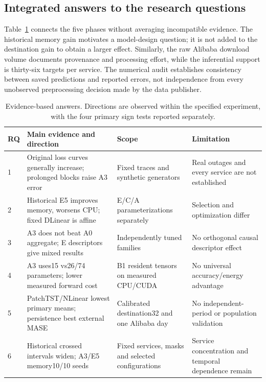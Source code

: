 \subsection{Integrated answers to the research questions}
Table~\ref{tab:rq} connects the five phases without averaging incompatible evidence. The historical memory gain motivates a model-design question; it is not added to the destination gain to obtain a larger effect. Similarly, the raw Alibaba download volume documents provenance and processing effort, while the inferential support is thirty-six targets per service. The numerical audit establishes consistency between saved predictions and reported errors, not independence from every unobserved preprocessing decision made by the data publisher.
\begin{table}[!t]
\caption{Evidence-based answers. Directions are observed within the specified experiment, with the four primary sign tests reported separately.}\label{tab:rq}
\centering\footnotesize
\begin{tabularx}{\linewidth}{p{.08\linewidth}XXX}
\toprule RQ & Main evidence and direction & Scope & Limitation \\\midrule
1 & Original loss curves generally increase; prolonged blocks raise A3 error & Fixed traces and synthetic generators & Real outages and every service are not established \\
2 & Historical E5 improves memory, worsens CPU; fixed DLinear is affine & E/C/A parameterizations separately & Selection and optimization differ \\
3 & A3 does not beat A0 aggregate; E descriptors give mixed results & Independently tuned families & No orthogonal causal descriptor effect \\
4 & A3 uses15 vs26/74 parameters; lower measured forward cost & B1 resident tensors on measured CPU/CUDA & No universal accuracy/energy advantage \\
5 & PatchTST/NLinear lowest primary means; persistence best external MASE & Calibrated destination32 and one Alibaba day & No independent-period or population validation \\
6 & Historical crossed intervals widen; A3/E5 memory10/10 seeds & Fixed services, masks and selected configurations & Service concentration and temporal dependence remain \\
\bottomrule
\end{tabularx}
\end{table}
